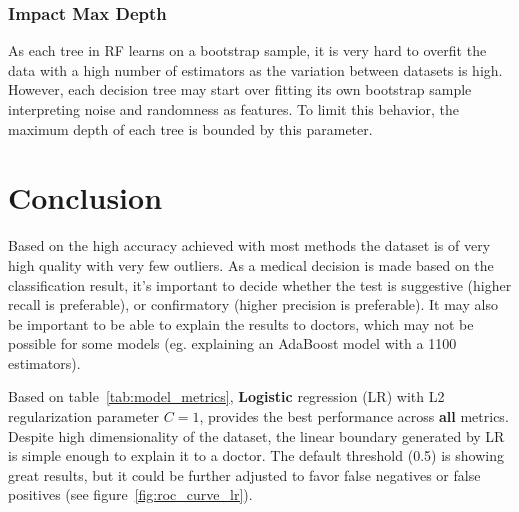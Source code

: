 \documentclass[12pt]{article}
\begin{document}
\vspace{-0.8cm}

\subsubsection*{Impact Max Depth}
As each tree in RF learns on a bootstrap sample, it is very hard to overfit the data with a high number of estimators as the variation between datasets is high. However, each decision tree may start over fitting its own bootstrap sample interpreting noise and randomness as features. To limit this behavior, the maximum depth of each tree is bounded by this parameter.

\section{Conclusion}
Based on the high accuracy achieved with most methods the dataset is of very high quality with very few outliers. As a medical decision is made based on the classification result, it's important to decide whether the test is suggestive (higher recall is preferable), or confirmatory (higher precision is preferable). It may also be important to be able to explain the results to doctors, which may not be possible for some models (eg. explaining an AdaBoost model with a 1100 estimators).
\par
Based on table~\ref{tab:model_metrics}, \textbf{Logistic} regression (LR) with L2 regularization parameter $C = 1$, provides the best performance across \textbf{all} metrics. Despite high dimensionality of the dataset, the linear boundary generated by LR is simple enough to explain it to a doctor. The default threshold (0.5) is showing great results, but it could be further adjusted to favor false negatives or false positives (see figure~\ref{fig:roc_curve_lr}).
\end{document}
